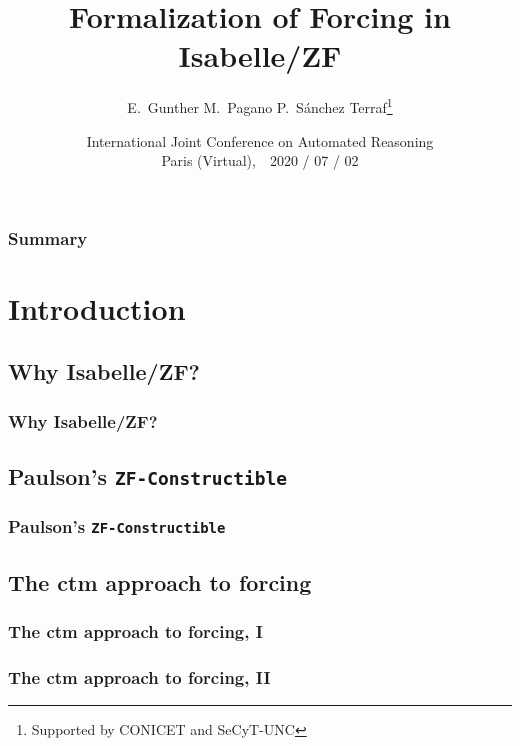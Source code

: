 \documentclass[english]{beamer}
\title[Forcing in Isabelle/ZF]{Formalization of Forcing in Isabelle/ZF}
\author[E.~Gunther, M.~Pagano, PST]{E.~Gunther \qquad M.~Pagano \qquad P.~Sánchez Terraf\thanks{Supported by
    CONICET and SeCyT-UNC} 
}
\institute[UNC]{CIEM-FaMAF --- Universidad Nacional de Córdoba}
\date[IJCAR 2020]{International Joint Conference on Automated
  Reasoning\\ Paris (Virtual),\ \  2020 / 07 / 02}
\begin{document}

\begin{frame}[plain]
  \titlepage
  \begin{center}
    \insertlogo
  \end{center}
\end{frame}
%
\begin{frame}
  \frametitle{Summary}
  \tableofcontents
  \transwipe
\end{frame}
%
\section{Introduction}

\subsection{Why Isabelle/ZF?}

\begin{frame}
  \frametitle{Why Isabelle/ZF?}
\end{frame}

\begin{frame}
  \frametitle{}
  
\end{frame}

\subsection{Paulson's \texttt{ZF-Constructible}}

\begin{frame}
  \frametitle{Paulson's \texttt{ZF-Constructible}}
\end{frame}


\subsection{The ctm approach to forcing}

\begin{frame}
  \frametitle{The ctm approach to forcing, I}
\end{frame}

\begin{frame}
  \frametitle{The ctm approach to forcing, II}
\end{frame}
\end{document}
